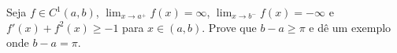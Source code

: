 Seja \(f\in C^1(a,b)\), \(\lim_{x\to a^+}f(x)=\infty\), \(\lim_{x\to b^-}f(x)=-\infty\) e \(f'(x)+f^2(x)\geq -1\) para \(x\in (a,b)\). Prove que \(b-a\geq\pi\) e dê um exemplo onde \(b-a=\pi\).
